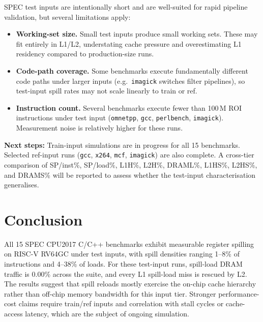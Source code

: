 \documentclass[conference]{IEEEtran}
\begin{document}
SPEC test inputs are intentionally short and are well-suited for
rapid pipeline validation, but several limitations apply:

\begin{itemize}
  \item \textbf{Working-set size.}
    Small test inputs produce small working sets.
    These may fit entirely in L1/L2, understating cache pressure
    and overestimating L1 residency compared to production-size runs.
  \item \textbf{Code-path coverage.}
    Some benchmarks execute fundamentally different code paths
    under larger inputs (e.g.\ \texttt{imagick} switches filter
    pipelines), so test-input spill rates may not scale linearly
    to train or ref.
  \item \textbf{Instruction count.}
    Several benchmarks execute fewer than 100\,M ROI instructions
    under test input (\texttt{omnetpp}, \texttt{gcc},
    \texttt{perlbench}, \texttt{imagick}).  Measurement noise is
    relatively higher for these runs.
\end{itemize}

\noindent
\textbf{Next steps:}
Train-input simulations are in progress for all 15 benchmarks.
Selected ref-input runs (\texttt{gcc}, \texttt{x264}, \texttt{mcf},
\texttt{imagick}) are also complete.
A cross-tier comparison of SP/inst\%, SP/load\%,
L1H\%, L2H\%, DRAML\%, L1HS\%, L2HS\%, and DRAMS\% will be reported
to assess whether the test-input characterisation generalises.

\section{Conclusion}

All 15 SPEC CPU2017 C/C++ benchmarks exhibit measurable register
spilling on RISC-V RV64GC under test inputs, with spill densities
ranging 1--8\% of instructions and 4--38\% of loads.
For these test-input runs, spill-load DRAM traffic is 0.00\%
across the suite, and every L1 spill-load miss is rescued by L2.
The results suggest that spill reloads mostly exercise the
on-chip cache hierarchy rather than off-chip memory bandwidth
for this input tier.
Stronger performance-cost claims require train/ref inputs
and correlation with stall cycles or cache-access latency,
which are the subject of ongoing simulation.
\end{document}
